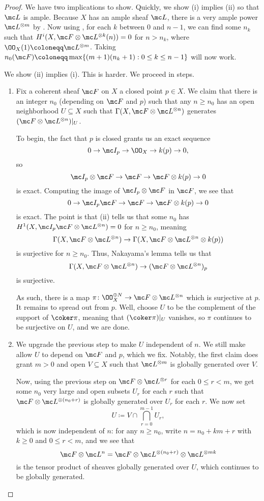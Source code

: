 \documentclass[../notes.tex]{subfiles}
\begin{document}
\begin{proof}
	We have two implications to show. Quickly, we show (i) implies (ii) so that $\mc L$ is ample. Because $X$ has an ample sheaf $\mc L$, there is a very ample power $\mc L^{\otimes m}$ by . Now using , for each $k$ between $0$ and $n-1$, we can find some $n_k$ such that $H^i(X,\mc F\otimes\mc L^{\otimes k}(n))=0$ for $n>n_k$, where $\OO_X(1)\coloneqq\mc L^{\otimes m}$. Taking $n_0(\mc F)\coloneqq\max\{(m+1)(n_k+1):0\le k\le n-1\}$ will now work.

	We show (ii) implies (i). This is harder. We proceed in steps.
	\begin{enumerate}
		\item Fix a coherent sheaf $\mc F$ on $X$ a closed point $p\in X$. We claim that there is an integer $n_0$ (depending on $\mc F$ and $p$) such that any $n\ge n_0$ has an open neighborhood $U\subseteq X$ such that $\Gamma(X,\mc F\otimes\mc L^{\otimes n})$ generates $(\mc F\otimes\mc L^{\otimes n})|_U$.

		To begin, the fact that $p$ is closed grants us an exact sequence
		\[0\to\mc I_p\to\OO_X\to k(p)\to0,\]
		so
		\[\mc I_p\otimes\mc F\to\mc F\to\mc F\otimes k(p)\to0\]
		is exact. Computing the image of $\mc I_p\otimes\mc F$ in $\mc F$, we see that
		\[0\to\mc I_p\mc F\to\mc F\to\mc F\otimes k(p)\to0\]
		is exact. The point is that (ii) tells us that some $n_0$ has $H^1(X,\mc I_p\mc F\otimes\mc L^{\otimes n})=0$ for $n\ge n_0$, meaning
		\[\Gamma(X,\mc F\otimes\mc L^{\otimes n})\to\Gamma(X,\mc F\otimes\mc L^{\otimes n}\otimes k(p))\]
		is surjective for $n\ge n_0$. Thus, Nakayama's lemma tells us that
		\[\Gamma(X,\mc F\otimes\mc L^{\otimes n})\to(\mc F\otimes\mc L^{\otimes n})_p\]
		is surjective.
		
		As such, there is a map $\pi\colon\OO_X^{\oplus N}\to\mc F\otimes\mc L^{\otimes n}$ which is surjective at $p$. It remains to spread out from $p$. Well, choose $U$ to be the complement of the support of $\coker\pi$, meaning that $(\coker\pi)|_U$ vanishes, so $\pi$ continues to be surjective on $U$, and we are done.
		
		\item We upgrade the previous step to make $U$ independent of $n$. We still make allow $U$ to depend on $\mc F$ and $p$, which we fix. Notably, the first claim does grant $m>0$ and open $V\subseteq X$ such that $\mc L^{\otimes m}$ is globally generated over $V$.

		Now, using the previous step on $\mc F\otimes\mc L^{\otimes r}$ for each $0\le r<m$, we get some $n_0$ very large and open subsets $U_r$ for each $r$ such that $\mc F\otimes\mc L^{\otimes(n_0+r)}$ is globally generated over $U_r$ for each $r$. We now set
		\[U\coloneqq V\cap\bigcap_{r=0}^{m-1}U_r,\]
		which is now independent of $n$: for any $n\ge n_0$, write $n=n_0+km+r$ with $k\ge0$ and $0\le r<m$, and we see that
		\[\mc F\otimes\mc L^{n}=\mc F\otimes\mc L^{\otimes(n_0+r)}\otimes\mc L^{\otimes mk}\]
		is the tensor product of sheaves globally generated over $U$, which continues to be globally generated.


\end{enumerate}
\end{proof}
\end{document}
